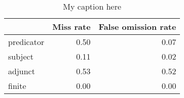 \begin{table}[!ht]
\centering
\begin{tabular}{lrr}
\toprule
{} &  Miss rate &  False omission rate \\
\midrule
predicator &       0.50 &                 0.07 \\
subject    &       0.11 &                 0.02 \\
adjunct    &       0.53 &                 0.52 \\
finite     &       0.00 &                 0.00 \\
\bottomrule
\end{tabular}
\caption{My caption here}
\label{tab:unit-elements-ocd-exact-errors}
\end{table}